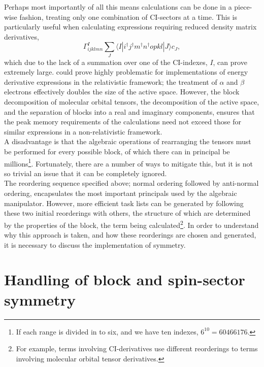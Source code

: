 \noindent Perhaps most importantly of all this means calculations
can be done in a piece-wise fashion, treating only one combination of CI-sectors
at a time. This is particularly useful when calculating expressions requiring reduced density matrix derivatives,
\begin{equation}
\Gamma^{I}_{ijklmn}\sum_{J}\langle I | i^{\dagger}j^{\dagger}m^{\dagger}n^{\dagger}opkl | J \rangle c_{J},
\end{equation}
which due to the lack of a summation over one of the CI-indexes, $I$, can prove extremely large. 
could prove highly problematic for implementations of energy derivative expressions in the
relativistic framework; the treatment of $\alpha$ and $\beta$ electrons effectively doubles
the size of the active space. However, the block decomposition of molecular orbital tensors,
the decomposition of the active space, and the separation of blocks into
a real and imaginary components, ensures that the peak memory requirements of the 
calculations need not exceed those for similar expressions in a non-relativistic framework.\\

\noindent A disadvantage is that the algebraic operations of
rearranging the tensors must be performed for every possible block, of which
there can in principal be millions\footnote{ If each range is divided in to 
six, and we have ten indexes, $6^{10} =60466176 $. }. Fortunately, there
are a number of ways to mitigate this, but it is not so trivial an issue that it can
be completely ignored.\\

\noindent The reordering sequence specified above; normal ordering followed by anti-normal 
ordering, encapsulates the most important principals used by the algebraic manipulator. However,
more efficient task lists can be generated by following these two initial reorderings with others, the
structure of which are determined by the properties of the block, the term being calculated\footnote{
For example, terms involving CI-derivatives use different reorderings to terms involving molecular orbital
tensor derivatives.}. In order to understand why this approach is taken, and how these reorderings
are chosen and generated, it is necessary to discuss the implementation of symmetry.

\section{Handling of block and spin-sector symmetry}


